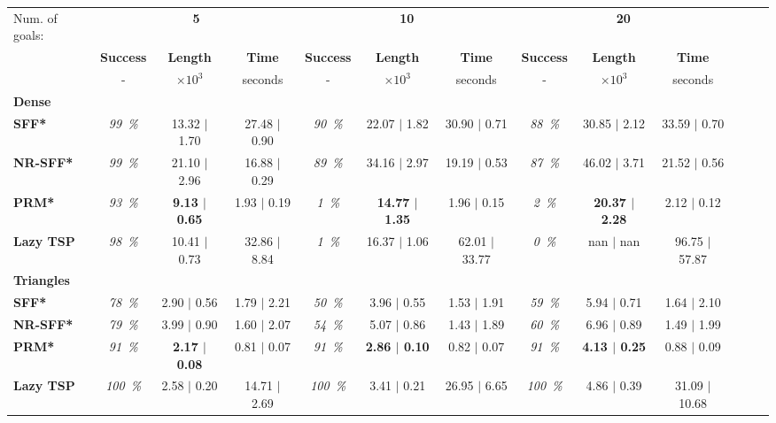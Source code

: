 \begin{tabular}{lccccccccc}
\toprule
 Num. of goals: & \multicolumn{3}{c}{ \bf 5 } & \multicolumn{3}{c}{ \bf 10 } & \multicolumn{3}{c}{ \bf 20 } \\ 
 \cmidrule(lr){2-4}  \cmidrule(lr){5-7}  \cmidrule(lr){8-10} 
 & {\bf Success } & {\bf Length } &  {\bf Time}  & {\bf Success } & {\bf Length } &  {\bf Time}  & {\bf Success } & {\bf Length } &  {\bf Time} \\ 
 & - & $\times 10^3$ & seconds  & - & $\times 10^3$ & seconds  & - & $\times 10^3$ & seconds \\ 
\midrule
\multicolumn{13}{l}{ \bf Dense} \\ 
{ \bf SFF*} 
 & \textit{ 99~\% }  &  13.32 $|$ 1.70  &  27.48 $|$ 0.90  & \textit{ 90~\% }  &  22.07 $|$ 1.82  &  30.90 $|$ 0.71  & \textit{ 88~\% }  &  30.85 $|$ 2.12  &  33.59 $|$ 0.70 \\ 
{ \bf NR-SFF*} 
 & \textit{ 99~\% }  &  21.10 $|$ 2.96  &  16.88 $|$ 0.29  & \textit{ 89~\% }  &  34.16 $|$ 2.97  &  19.19 $|$ 0.53  & \textit{ 87~\% }  &  46.02 $|$ 3.71  &  21.52 $|$ 0.56 \\ 
{ \bf PRM*} 
 & \textit{ 93~\% }  & { \bf  9.13 $|$ 0.65 }  &  1.93 $|$ 0.19  & \textit{ 1~\% }  & { \bf  14.77 $|$ 1.35 }  &  1.96 $|$ 0.15  & \textit{ 2~\% }  & { \bf  20.37 $|$ 2.28 }  &  2.12 $|$ 0.12 \\ 
{ \bf Lazy TSP} 
 & \textit{ 98~\% }  &  10.41 $|$ 0.73  &  32.86 $|$ 8.84  & \textit{ 1~\% }  &  16.37 $|$ 1.06  &  62.01 $|$ 33.77  & \textit{ 0~\% }  &  nan $|$ nan  &  96.75 $|$ 57.87 \\ 
\midrule
\multicolumn{13}{l}{ \bf Triangles} \\ 
{ \bf SFF*} 
 & \textit{ 78~\% }  &  2.90 $|$ 0.56  &  1.79 $|$ 2.21  & \textit{ 50~\% }  &  3.96 $|$ 0.55  &  1.53 $|$ 1.91  & \textit{ 59~\% }  &  5.94 $|$ 0.71  &  1.64 $|$ 2.10 \\ 
{ \bf NR-SFF*} 
 & \textit{ 79~\% }  &  3.99 $|$ 0.90  &  1.60 $|$ 2.07  & \textit{ 54~\% }  &  5.07 $|$ 0.86  &  1.43 $|$ 1.89  & \textit{ 60~\% }  &  6.96 $|$ 0.89  &  1.49 $|$ 1.99 \\ 
{ \bf PRM*} 
 & \textit{ 91~\% }  & { \bf  2.17 $|$ 0.08 }  &  0.81 $|$ 0.07  & \textit{ 91~\% }  & { \bf  2.86 $|$ 0.10 }  &  0.82 $|$ 0.07  & \textit{ 91~\% }  & { \bf  4.13 $|$ 0.25 }  &  0.88 $|$ 0.09 \\ 
{ \bf Lazy TSP} 
 & \textit{ 100~\% }  &  2.58 $|$ 0.20  &  14.71 $|$ 2.69  & \textit{ 100~\% }  &  3.41 $|$ 0.21  &  26.95 $|$ 6.65  & \textit{ 100~\% }  &  4.86 $|$ 0.39  &  31.09 $|$ 10.68 \\ 

\end{tabular}
